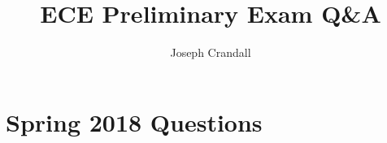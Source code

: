 
\usepackage{algorithm, algpseudocode, color, gensymb, siunitx, soul, subfiles}

\title{ECE Preliminary Exam Q\&A}
\author{Joseph Crandall}


\maketitle

%

\section{Spring 2018 Questions}


%

%

%

%

%

%


